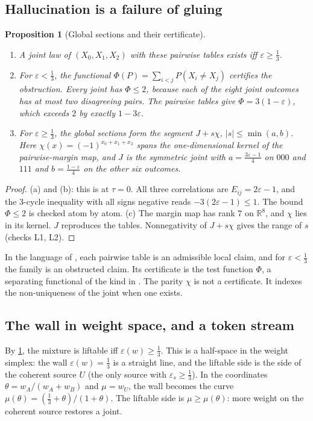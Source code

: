 \documentclass[11pt]{article}
\newtheorem{proposition}[theorem]{Proposition}
\theoremstyle{definition}
\newcommand{\R}{\mathbb R}
\begin{document}
\subsection{Hallucination is a failure of gluing}
\begin{proposition}[Global sections and their certificate]\label{prop:three-bit}
\begin{enumerate}[label=(\alph*)]
\item A joint law of $(X_0,X_1,X_2)$ with these pairwise tables exists iff $\varepsilon\ge\tfrac13$.
\item For $\varepsilon<\tfrac13$, the functional $\Phi(P)=\sum_{i<j}P(X_i\ne X_j)$ certifies the obstruction. Every joint has $\Phi\le2$,
  because each of the eight joint outcomes has at most two disagreeing pairs. The pairwise tables give $\Phi=3(1-\varepsilon)$,
  which exceeds $2$ by exactly $1-3\varepsilon$.
\item For $\varepsilon\ge\tfrac13$, the global sections form the segment $J+s\chi$, $|s|\le\min(a,b)$. Here
  $\chi(x)=(-1)^{x_0+x_1+x_2}$ spans the one-dimensional kernel of the pairwise-margin map, and $J$ is the symmetric joint with
  $a=\tfrac{3\varepsilon-1}4$ on $000$ and $111$ and $b=\tfrac{1-\varepsilon}4$ on the other six outcomes.
\end{enumerate}
\end{proposition}
\begin{proof}
(a) and (b): this is \cite[Thm.~4.8]{Conditionals} at $\tau=0$. All three correlations are $E_{ij}=2\varepsilon-1$, and the
3-cycle inequality with all signs negative reads $-3(2\varepsilon-1)\le1$. The bound $\Phi\le2$ is checked atom by atom. (c) The margin
map has rank $7$ on $\R^8$, and $\chi$ lies in its kernel. $J$ reproduces the tables. Nonnegativity of $J+s\chi$ gives the range of
$s$ (checks L1, L2).
\end{proof}

In the language of \cite[\S10]{Tower}, each pairwise table is an admissible local claim, and for $\varepsilon<\tfrac13$ the family is an
obstructed claim. Its certificate is the test function $\Phi$, a separating functional of the kind in \cite[Thm.~10.8]{Tower}. The
parity $\chi$ is not a certificate. It indexes the non-uniqueness of the joint when one exists.

\subsection{The wall in weight space, and a token stream}
By \cref{prop:three-bit}, the mixture is liftable iff $\varepsilon(w)\ge\tfrac13$. This is a half-space in the weight simplex: the wall
$\varepsilon(w)=\tfrac13$ is a straight line, and the liftable side is the side of the coherent source $U$ (the only source with
$\varepsilon_s\ge\tfrac13$). In the coordinates $\theta=w_A/(w_A+w_B)$ and $\mu=w_U$, the wall becomes the curve
$\mu(\theta)=(\tfrac13+\theta)/(1+\theta)$. The liftable side is $\mu\ge\mu(\theta)$: more weight on the coherent source restores a joint.
\end{document}
